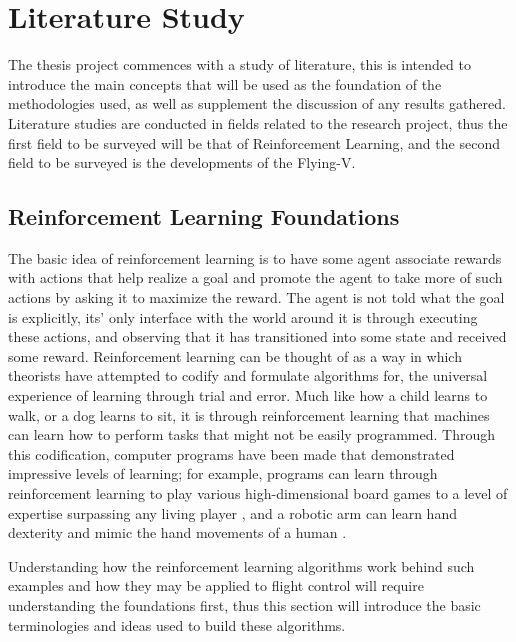 \documentclass[../report.tex]{subfiles}
\begin{document}
\chapter{Literature Study}
\label{ch:literature_study}

\newfontfamily{}

The thesis project commences with a study of literature, this is intended to introduce the main concepts that will be used as the foundation of the methodologies used, as well as supplement the discussion of any results gathered. Literature studies are conducted in fields related to the research project, thus the first field to be surveyed will be that of Reinforcement Learning, and the second field to be surveyed is the developments of the Flying-V. 


\section{Reinforcement Learning Foundations}

The basic idea of reinforcement learning is to have some agent associate rewards with actions that help realize a goal and promote the agent to take more of such actions by asking it to maximize the reward. The agent is not told what the goal is explicitly, its' only interface with the world around it is through executing these actions, and observing that it has transitioned into some state and received some reward. Reinforcement learning can be thought of as a way in which theorists have attempted to codify and formulate algorithms for, the universal experience of learning through trial and error. Much like how a child learns to walk, or a dog learns to sit, it is through reinforcement learning that machines can learn how to perform tasks that might not be easily programmed. Through this codification, computer programs have been made that demonstrated impressive levels of learning; for example, programs can learn through reinforcement learning to play various high-dimensional board games to a level of expertise surpassing any living player \cite{alpha_zero}, and a robotic arm can learn hand dexterity and mimic the hand movements of a human \cite{OpenAI_dexterity}.

Understanding how the reinforcement learning algorithms work behind such examples and how they may be applied to flight control will require understanding the foundations first, thus this section will introduce the basic terminologies and ideas used to build these algorithms.
\end{document}
